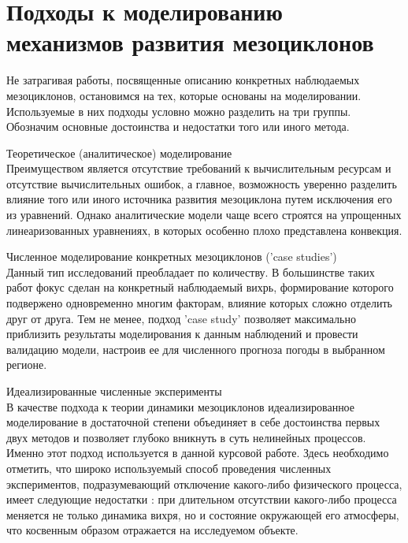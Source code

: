 \section*{Подходы к моделированию механизмов развития мезоциклонов}
Не затрагивая работы, посвященные описанию конкретных наблюдаемых мезоциклонов, остановимся на тех, которые основаны на моделировании. Используемые в них подходы условно можно разделить на три группы. Обозначим основные достоинства и недостатки того или иного метода.
\begin{sqlist}
\item Теоретическое (аналитическое) моделирование \\
Преимуществом является отсутствие требований к вычислительным ресурсам и отсутствие вычислительных ошибок, а главное, возможность уверенно разделить влияние того или иного источника развития мезоциклона путем исключения его из уравнений. Однако аналитические модели чаще всего строятся на упрощенных линеаризованных уравнениях, в которых особенно плохо представлена конвекция. 

\item Численное моделирование конкретных мезоциклонов ('case studies') \\
Данный тип исследований преобладает по количеству. В большинстве таких работ фокус сделан на конкретный наблюдаемый вихрь, формирование которого подвержено одновременно многим факторам, влияние которых сложно отделить друг от друга. Тем не менее, подход 'case study' позволяет максимально приблизить результаты моделирования к данным наблюдений и провести валидацию модели, настроив ее для численного прогноза погоды в выбранном регионе.

\item Идеализированные численные эксперименты \\
В качестве подхода к теории динамики мезоциклонов идеализированное моделирование в достаточной степени объединяет в себе достоинства первых двух методов и позволяет глубоко вникнуть в суть нелинейных процессов. Именно этот подход используется в данной курсовой работе.
Здесь необходимо отметить, что широко используемый способ проведения численных экспериментов, подразумевающий отключение какого-либо физического процесса, имеет следующие недостатки \citep{YanaseEtAl2004}: при длительном отсутствии какого-либо процесса меняется не только динамика вихря, но и состояние окружающей его атмосферы, что косвенным образом отражается на исследуемом объекте.
\end{sqlist}

